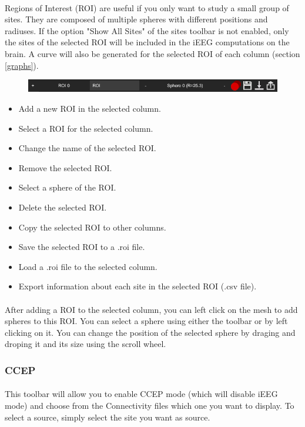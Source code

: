 \documentclass[a4paper]{article}
\begin{document}
\paragraph{} Regions of Interest (ROI) are useful if you only want to study a small group of sites. They are composed of multiple spheres with different positions and radiuses. If the option "Show All Sites" of the sites toolbar is not enabled, only the sites of the selected ROI will be included in the iEEG computations on the brain. A curve will also be generated for the selected ROI of each column (section \ref{graphs}).
\begin{figure}[H]
\begin{center}
\includegraphics[scale=0.45]{ROI.png}
\end{center}
\end{figure}
\begin{itemize}
\item Add a new ROI in the selected column.
\item Select a ROI for the selected column.
\item Change the name of the selected ROI.
\item Remove the selected ROI.
\item Select a sphere of the ROI.
\item Delete the selected ROI.
\item Copy the selected ROI to other columns.
\item Save the selected ROI to a .roi file.
\item Load a .roi file to the selected column.
\item Export information about each site in the selected ROI (.csv file).
\end{itemize}
\paragraph{} After adding a ROI to the selected column, you can left click on the mesh to add spheres to this ROI. You can select a sphere using either the toolbar or by left clicking on it. You can change the position of the selected sphere by draging and droping it and its size using the scroll wheel.
\subsubsection{CCEP}
\paragraph{} This toolbar will allow you to enable CCEP mode (which will disable iEEG mode) and choose from the Connectivity files which one you want to display. To select a source, simply select the site you want as source.
\end{document}
